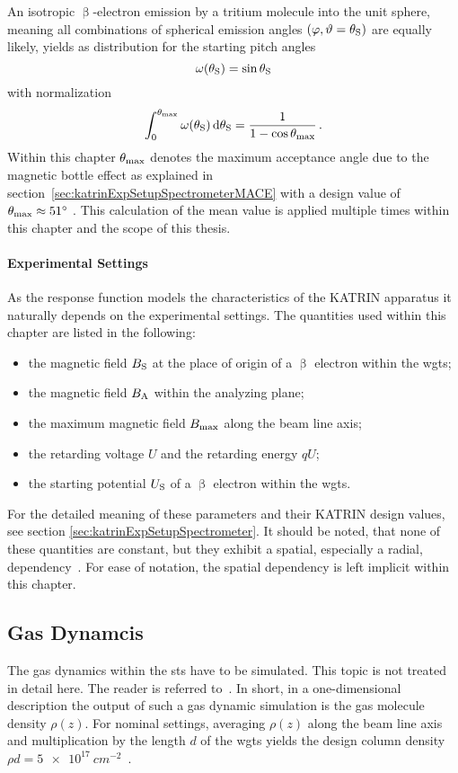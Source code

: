 An isotropic $\upbeta$-electron emission by a tritium molecule into the unit sphere, meaning all combinations of spherical emission angles $(\varphi, \vartheta=\theta_\mathrm{S})$ are equally likely, yields as distribution for the starting pitch angles\cite{Angrik:2005ep}
\begin{equation}
\omega(\theta_\mathrm{S}) = \sin\theta_\mathrm{S}
\end{equation}
with normalization
\begin{equation}
	\int_{0}^{\theta_\mathrm{max}} 
	\omega(\theta_\mathrm{S})
	\mathop{}\!\mathrm{d} \theta_\mathrm{S} = 
	\frac{1}{1-\cos\theta_\mathrm{max}}
	\text{\,.}
\end{equation}
Within this chapter $\theta_\mathrm{max}$ denotes the maximum acceptance angle due to the magnetic bottle effect as explained in section~\ref{sec:katrinExpSetupSpectrometerMACE} with a design value of $\theta_\mathrm{max}\approx\SI{51}{\degree}$ \cite{Angrik:2005ep}. This calculation of the mean value is applied multiple times within this chapter and the scope of this thesis.

\paragraph{Experimental Settings}
As the response function models the characteristics of the KATRIN apparatus it naturally depends on the experimental settings. The quantities used within this chapter are listed in the following:
\begin{itemize}
	\item the magnetic field $B_\mathrm{S}$ at the place of origin of a $\upbeta$ electron within the \gls{wgts};
	\item the magnetic field $B_\mathrm{A}$ within the analyzing plane;
	\item the maximum magnetic field $B_\mathrm{max}$ along the beam line axis;
	\item the retarding voltage $U$ and the retarding energy $qU$;
	\item the starting potential $U_\mathrm{S}$ of a $\upbeta$ electron within the \gls{wgts}.
\end{itemize}
For the detailed meaning of these parameters and their KATRIN design values, see section \ref{sec:katrinExpSetupSpectrometer}.
It should be noted, that none of these quantities are constant, but they exhibit a spatial, especially a radial, dependency~\cite{Angrik:2005ep}. For ease of notation, the spatial dependency is left implicit within this chapter.


\subsection{Gas Dynamcis}
\label{sec:intSpecModelResponseGasDynamics}
The gas dynamics within the \gls{sts} have to be simulated. This topic is not treated in detail here. The reader is referred to~\cite{Hoetzel2012}. In short, in a one-dimensional description the output of such a gas dynamic simulation is the gas molecule density $\rho(z)$. For nominal settings, averaging $\rho(z)$ along the beam line axis and multiplication by the length $d$ of the \gls{wgts} yields the design column density $\rho d = \SI{5e17}{cm^{-2}}$~\cite{Angrik:2005ep}.

